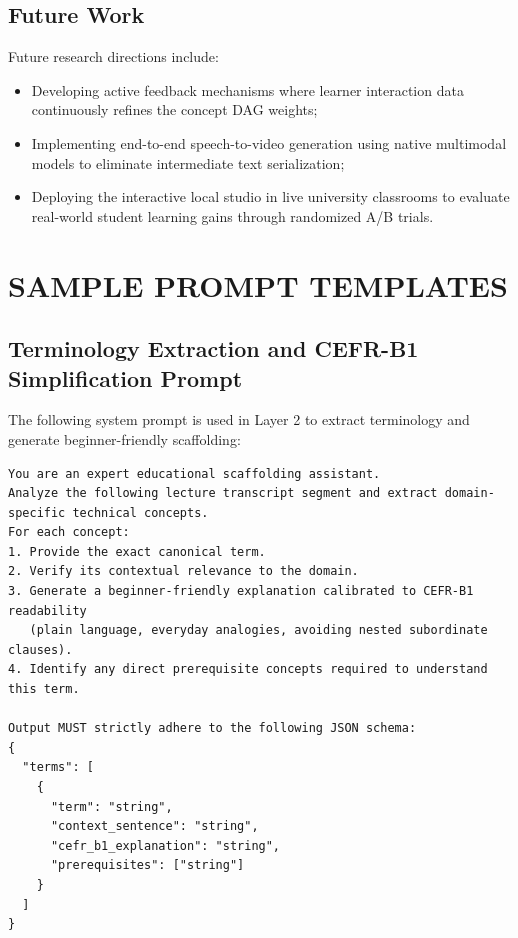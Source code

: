 \documentclass[a4paper,12pt]{report}
\begin{document}
\section{Future Work}
Future research directions include:
\begin{itemize}
    \item Developing active feedback mechanisms where learner interaction data continuously refines the concept DAG weights;
    \item Implementing end-to-end speech-to-video generation using native multimodal models to eliminate intermediate text serialization;
    \item Deploying the interactive local studio in live university classrooms to evaluate real-world student learning gains through randomized A/B trials.
\end{itemize}




\appendix

\chapter{SAMPLE PROMPT TEMPLATES}
\label{app:prompts}

\section{Terminology Extraction and CEFR-B1 Simplification Prompt}
The following system prompt is used in Layer 2 to extract terminology and generate beginner-friendly scaffolding:

\begin{lstlisting}
You are an expert educational scaffolding assistant.
Analyze the following lecture transcript segment and extract domain-specific technical concepts.
For each concept:
1. Provide the exact canonical term.
2. Verify its contextual relevance to the domain.
3. Generate a beginner-friendly explanation calibrated to CEFR-B1 readability
   (plain language, everyday analogies, avoiding nested subordinate clauses).
4. Identify any direct prerequisite concepts required to understand this term.

Output MUST strictly adhere to the following JSON schema:
{
  "terms": [
    {
      "term": "string",
      "context_sentence": "string",
      "cefr_b1_explanation": "string",
      "prerequisites": ["string"]
    }
  ]
}
\end{lstlisting}
\end{document}
